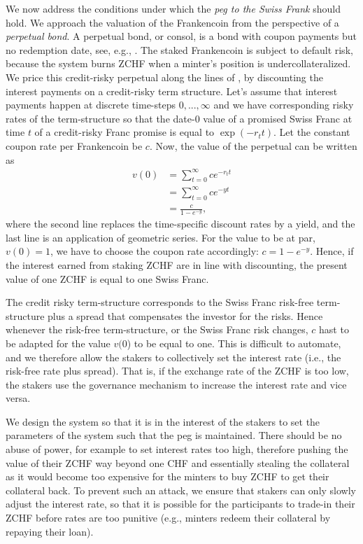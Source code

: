 \documentclass[english,11pt]{article}
\begin{document}
We now address the conditions
under which the \emph{peg to the Swiss Frank} should hold.
We approach the valuation of the Frankencoin from the perspective
of a \emph{perpetual bond}. A perpetual bond, or consol, is
a bond with coupon payments but no redemption date, see, e.g.,
\cite{jorion2010financial}.
The staked Frankencoin is subject to default risk, because the system
burns ZCHF when a minter's position is undercollateralized. 
We price this credit-risky perpetual along the lines of \cite{jarrow2000derivative},
by discounting the interest payments on a credit-risky term structure.
Let's assume that interest payments happen at discrete time-steps $0,...,\infty$
and we have corresponding risky rates of the term-structure
so that the date-0 value of a promised Swiss Franc at time $t$ of a credit-risky
Franc promise is equal
to $\exp(-r_t t)$. Let the constant coupon rate per Frankencoin be $c$. 
Now, the value of the perpetual can be written as
\begin{align}
v(0) &= \sum_{t=0}^{\infty} c e^{-r_t t} \\
	 &= \sum_{t=0}^{\infty} c e^{-y t} \\
	 &= \frac{c}{1-e^{-y}},
\end{align}
where the second line replaces the time-specific discount rates by
a yield, and the last line is an application of geometric series.
For the value to be at par, $v(0)=1$, we have to choose the coupon rate
accordingly: $c = 1-e^{-y}$. Hence, if the interest earned from staking 
ZCHF are in line with discounting, the present value of one ZCHF is equal 
to one Swiss Franc.

The credit risky term-structure corresponds to the Swiss Franc risk-free term-structure
plus a spread that compensates the investor for the risks. 
Hence whenever the risk-free term-structure, or the Swiss Franc risk
changes, $c$ hast to be adapted for the value $v(0$) to be equal to one.
This is difficult to automate, and
we therefore allow the stakers to collectively set the interest 
rate (i.e., the risk-free rate plus spread). That is, if the 
exchange rate of the ZCHF is too low, the stakers use the governance mechanism to increase the interest rate and vice versa.

We design the system so that it is in the interest of the stakers 
to set the parameters of the system such that the peg is maintained. 
There should be no abuse of power, for example to set interest rates too high, therefore pushing the value of their ZCHF way beyond one CHF and essentially stealing the collateral as it would become too expensive for the minters to buy ZCHF to get their collateral back. To prevent such an attack, we ensure that stakers can only slowly adjust the interest rate, 
so that it is possible for the participants to trade-in their ZCHF 
before rates are too punitive (e.g., minters redeem their collateral by repaying their loan).
\end{document}
